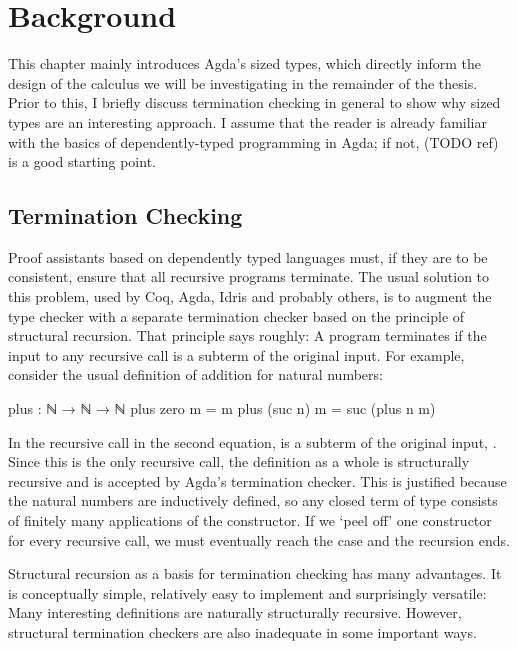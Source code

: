 \chapter{Background}
\label{sec:background}

This chapter mainly introduces Agda's sized types, which directly inform the
design of the calculus we will be investigating in the remainder of the thesis.
Prior to this, I briefly discuss termination checking in general to show why
sized types are an interesting approach. I assume that the reader is already
familiar with the basics of dependently-typed programming in Agda; if not, (TODO
ref) is a good starting point.


\section{Termination Checking}
\label{sec:background:termination}

Proof assistants based on dependently typed languages must, if they are to be
consistent, ensure that all recursive programs terminate. The usual solution to
this problem, used by Coq, Agda, Idris and probably others, is to augment the
type checker with a separate termination checker based on the principle of
structural recursion. That principle says roughly: A program terminates if the
input to any recursive call is a subterm of the original input. For example,
consider the usual definition of addition for natural numbers:
\begin{code}
  plus : ℕ → ℕ → ℕ
  plus zero    m = m
  plus (suc n) m = suc (plus n m)
\end{code}

In the recursive call in the second equation,  is a subterm of the
original input, . Since this is the only recursive call, the
definition as a whole is structurally recursive and is accepted by Agda's
termination checker. This is justified because the natural numbers are
inductively defined, so any closed term of type  consists of finitely
many applications of the  constructor. If we \enquote*{peel off} one
constructor for every recursive call, we must eventually reach the 
case and the recursion ends.

Structural recursion as a basis for termination checking has many advantages. It
is conceptually simple, relatively easy to implement and surprisingly versatile:
Many interesting definitions are naturally structurally recursive. However,
structural termination checkers are also inadequate in some important ways.

